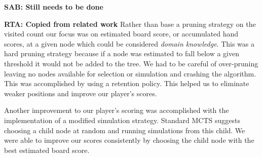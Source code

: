 \documentclass[letterpaper]{article}
\begin{document}


{\bf SAB: Still needs to be done}

{\bf RTA: Copied from related work}
Rather than base a pruning strategy on the visited count our focus was on estimated board score, or accumulated hand scores, at a given node which could be considered \emph{domain knowledge}. This was a hard pruning strategy because if a node was estimated to fall below a given threshold it would not be added to the tree. We had to be careful of over-pruning leaving no nodes available for selection or simulation and crashing the algorithm. This was accomplished by using a retention policy. This helped us to eliminate weaker positions and improve our player's scores.

Another improvement to our player's scoring was accomplished with the implementation of a modified simulation strategy. Standard MCTS suggests choosing a child node at random and running simulations from this child. We were able to improve our scores consistently by choosing the child node with the best estimated board score.
\end{document}
